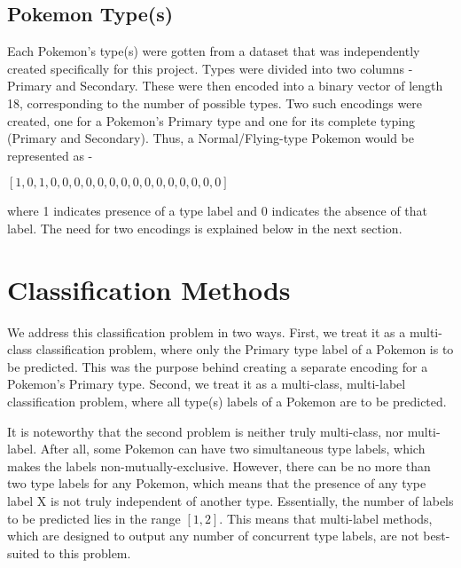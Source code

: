 \documentclass{winnower}
\begin{document}

\subsection{Pokemon Type(s)}

Each Pokemon's type(s) were gotten from a dataset that was independently created specifically for this project. Types were divided into two columns - Primary and Secondary. These were then encoded into a binary vector of length 18, corresponding to the number of possible types. Two such encodings were created, one for a Pokemon's Primary type and one for its complete typing (Primary and Secondary). Thus, a Normal/Flying-type Pokemon would be represented as -
\begin{center}
    

                      $[ 1, 0, 1, 0, 0, 0, 0, 0, 0, 0, 0, 0, 0, 0, 0, 0, 0, 0] $\\
                      \end{center}
where 1 indicates presence of a type label and 0 indicates the absence of that label. The need for two encodings is explained below in the next section.

\section{Classification Methods }

We address this classification problem in two ways. First, we treat it as a multi-class classification problem, where only the Primary type label of a Pokemon is to be predicted. This was the purpose behind creating a separate encoding for a Pokemon's Primary type. Second, we treat it as a multi-class, multi-label classification problem, where all type(s) labels of a Pokemon are to be predicted.

It is noteworthy that the second problem is neither truly multi-class, nor multi-label. After all, some Pokemon can have two simultaneous type labels, which makes the labels non-mutually-exclusive. However, there can be no more than two type labels for any Pokemon, which means that the presence of any type label X is not truly independent of another type. Essentially, the number of labels to be predicted lies in the range $[1, 2]$. This means that multi-label methods, which are designed to output any number of concurrent type labels, are not best-suited to this problem.
\end{document}
